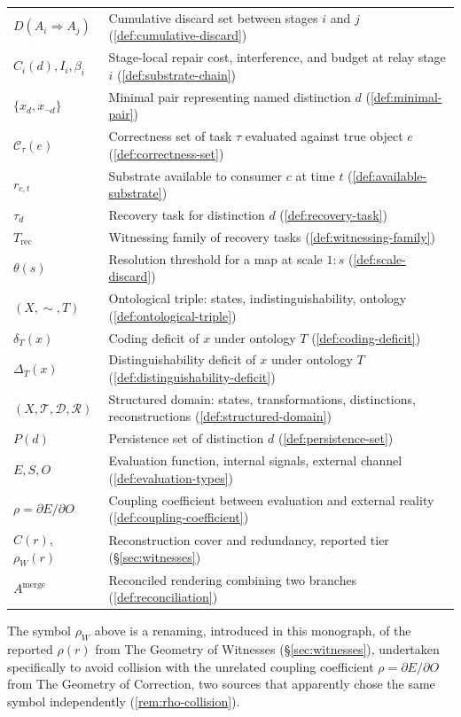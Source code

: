 {\begin{longtable}{p{2.6cm}p{7.2cm}}
$D(A_i \Rightarrow A_j)$ & Cumulative discard set between stages $i$ and $j$ (\cref{def:cumulative-discard}) \\
$C_i(d), I_i, \beta_i$ & Stage-local repair cost, interference, and budget at relay stage $i$ (\cref{def:substrate-chain}) \\
$\{x_d, x_{\neg d}\}$ & Minimal pair representing named distinction $d$ (\cref{def:minimal-pair}) \\
$\mathcal{C}_\tau(e)$ & Correctness set of task $\tau$ evaluated against true object $e$ (\cref{def:correctness-set}) \\
$r_{c,t}$ & Substrate available to consumer $c$ at time $t$ (\cref{def:available-substrate}) \\
$\tau_d$ & Recovery task for distinction $d$ (\cref{def:recovery-task}) \\
$T_{\mathrm{rec}}$ & Witnessing family of recovery tasks (\cref{def:witnessing-family}) \\
$\theta(s)$ & Resolution threshold for a map at scale $1{:}s$ (\cref{def:scale-discard}) \\
$(X,\sim,T)$ & Ontological triple: states, indistinguishability, ontology (\cref{def:ontological-triple}) \\
$\delta_T(x)$ & Coding deficit of $x$ under ontology $T$ (\cref{def:coding-deficit}) \\
$\Delta_T(x)$ & Distinguishability deficit of $x$ under ontology $T$ (\cref{def:distinguishability-deficit}) \\
$(X,\mathcal{T},\mathcal{D},\mathcal{R})$ & Structured domain: states, transformations, distinctions, reconstructions (\cref{def:structured-domain}) \\
$P(d)$ & Persistence set of distinction $d$ (\cref{def:persistence-set}) \\
$E, S, O$ & Evaluation function, internal signals, external channel (\cref{def:evaluation-types}) \\
$\rho = \partial E/\partial O$ & Coupling coefficient between evaluation and external reality (\cref{def:coupling-coefficient}) \\
$C(r)$, $\rho_W(r)$ & Reconstruction cover and redundancy, reported tier (\S\ref{sec:witnesses}) \\
$A^{\mathrm{merge}}$ & Reconciled rendering combining two branches (\cref{def:reconciliation}) \\
\bottomrule
\end{longtable}
}

The symbol $\rho_W$ above is a renaming, introduced in this monograph,
of the reported $\rho(r)$ from The Geometry of Witnesses
(\S\ref{sec:witnesses}), undertaken specifically to avoid collision with
the unrelated coupling coefficient $\rho = \partial E/\partial O$ from
The Geometry of Correction, two sources that apparently chose the same
symbol independently (\cref{rem:rho-collision}).
